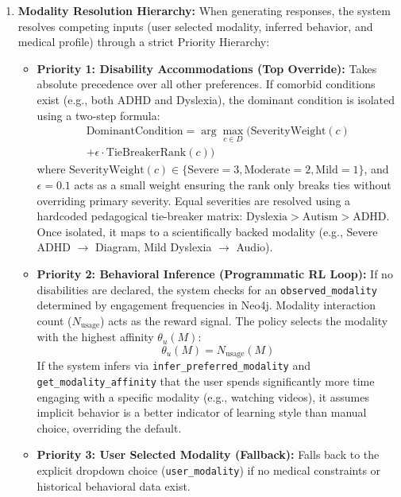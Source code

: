 \documentclass[final,5p,times,twocolumn,authoryear]{elsarticle}
\begin{document}
\begin{enumerate}
    \item \textbf{Modality Resolution Hierarchy:} When generating responses, the system resolves competing inputs (user selected modality, inferred behavior, and medical profile) through a strict Priority Hierarchy:
    \begin{itemize}
        \item \textbf{Priority 1: Disability Accommodations (Top Override):} Takes absolute precedence over all other preferences. If comorbid conditions exist (e.g., both ADHD and Dyslexia), the dominant condition is isolated using a two-step formula:
        \begin{equation}
        \begin{split}
            \text{DominantCondition} = \arg\max_{c \in D} \Big( \text{SeverityWeight}(c)\\ +  \epsilon \cdot \text{TieBreakerRank}(c) \Big)
            \end{split}
        \end{equation}
        where $\text{SeverityWeight}(c) \in \{\text{Severe}=3, \text{Moderate}=2, \text{Mild}=1\}$, and $\epsilon = 0.1$ acts as a small weight ensuring the rank only breaks ties without overriding primary severity. Equal severities are resolved using a hardcoded pedagogical tie-breaker matrix: $\text{Dyslexia} > \text{Autism} > \text{ADHD}$. Once isolated, it maps to a scientifically backed modality (e.g., Severe ADHD $\rightarrow$ Diagram, Mild Dyslexia $\rightarrow$ Audio).
        
        \item \textbf{Priority 2: Behavioral Inference (Programmatic RL Loop):} If no disabilities are declared, the system checks for an \texttt{observed\_modality} determined by engagement frequencies in Neo4j. Modality interaction count ($N_{\text{usage}}$) acts as the reward signal. The policy selects the modality with the highest affinity $\theta_u(M)$:
        \begin{equation}
            \theta_u(M) = N_{\text{usage}}(M)
        \end{equation}
        If the system infers via \texttt{infer\_preferred\_modality} and \texttt{get\_modality\_affinity} that the user spends significantly more time engaging with a specific modality (e.g., watching videos), it assumes implicit behavior is a better indicator of learning style than manual choice, overriding the default.
        
        \item \textbf{Priority 3: User Selected Modality (Fallback):} Falls back to the explicit dropdown choice (\texttt{user\_modality}) if no medical constraints or historical behavioral data exist.
    \end{itemize}


\end{enumerate}
\end{document}
